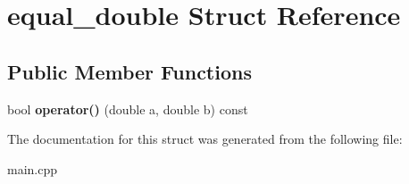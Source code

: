 \hypertarget{structequal__double}{}\section{equal\+\_\+double Struct Reference}
\label{structequal__double}
\subsection*{Public Member Functions}
\begin{DoxyCompactItemize}
\item 
\mbox{\label{structequal__double_aaa64f63d80b38ae3bf467da1cfb74d2d}} 
bool {\bfseries operator()} (double a, double b) const
\end{DoxyCompactItemize}


The documentation for this struct was generated from the following file\+:\begin{DoxyCompactItemize}
\item 
main.\+cpp\end{DoxyCompactItemize}
